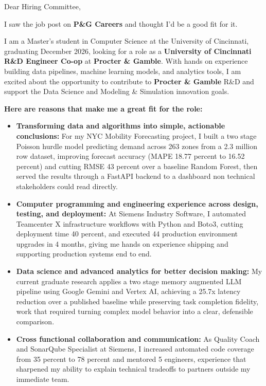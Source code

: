 \documentclass[11pt]{letter}
\date{}
\begin{document}
\begin{letter}{}

\opening{Dear Hiring Committee,}

I saw the job post on \textbf{P\&G Careers} and thought I'd be a good fit for it.

I am a Master's student in Computer Science at the University of Cincinnati, graduating December 2026, looking for a role as a \textbf{University of Cincinnati R\&D Engineer Co-op} at \textbf{Procter \& Gamble}. With hands on experience building data pipelines, machine learning models, and analytics tools, I am excited about the opportunity to contribute to \textbf{Procter \& Gamble} R\&D and support the Data Science and Modeling \& Simulation innovation goals.

\textbf{Here are reasons that make me a great fit for the role:}

\begin{itemize}[leftmargin=*, itemsep=0.45em]
    \item \textbf{Transforming data and algorithms into simple, actionable conclusions:} For my NYC Mobility Forecasting project, I built a two stage Poisson hurdle model predicting demand across 263 zones from a 2.3 million row dataset, improving forecast accuracy (MAPE 18.77 percent to 16.52 percent) and cutting RMSE 43 percent over a baseline Random Forest, then served the results through a FastAPI backend to a dashboard non technical stakeholders could read directly.

    \item \textbf{Computer programming and engineering experience across design, testing, and deployment:} At Siemens Industry Software, I automated Teamcenter X infrastructure workflows with Python and Boto3, cutting deployment time 40 percent, and executed 44 production environment upgrades in 4 months, giving me hands on experience shipping and supporting production systems end to end.

    \item \textbf{Data science and advanced analytics for better decision making:} My current graduate research applies a two stage memory augmented LLM pipeline using Google Gemini and Vertex AI, achieving a 25.7x latency reduction over a published baseline while preserving task completion fidelity, work that required turning complex model behavior into a clear, defensible comparison.

    \item \textbf{Cross functional collaboration and communication:} As Quality Coach and SonarQube Specialist at Siemens, I increased automated code coverage from 35 percent to 78 percent and mentored 5 engineers, experience that sharpened my ability to explain technical tradeoffs to partners outside my immediate team.
\end{itemize}


\end{letter}
\end{document}
